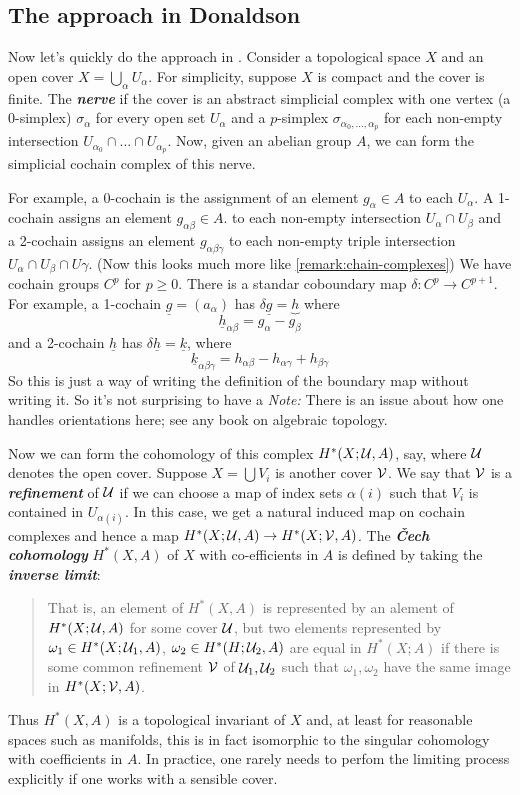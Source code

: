 \subsection{The approach in Donaldson}

Now let's quickly do the approach in \cite{donaldson}.
Consider a topological space $X$ and an open cover $X=\bigcup_\alpha U_\alpha$. For simplicity, suppose $X$ is compact and the cover is finite. The \textbf{\textit{nerve}} if the cover is an abstract simplicial complex with one vertex (a 0-simplex) $\sigma_\alpha$ for every open set $U_\alpha$ and a $p$-simplex $\sigma_{\alpha_0,\ldots,\alpha_p}$ for each non-empty intersection $U_{\alpha_0}\cap\ldots\cap U_{\alpha_p}$. Now, given an abelian group $A$, we can form the simplicial cochain complex of this nerve.

For example, a 0-cochain is the assignment of an element $g_\alpha\in A$ to each $U_\alpha$. A 1-cochain assigns an element $g_{\alpha\beta}\in A$. to each non-empty intersection $U_\alpha\cap U_\beta$ and a 2-cochain assigns an element $g_{\alpha\beta\gamma}$ to each non-empty triple intersection $U_\alpha\cap U_\beta\cap U\gamma$. {\color{cyan}(Now this looks much more like \cref{remark:chain-complexes})} We have cochain groups $C^p$ for $p\geq 0$. There is a standar coboundary map $\delta:C^p\to C^{p+1}$. For example, a 1-cochain $\underline{g}=(a_\alpha)$ has $\delta\underline{g}=\underbrace{h}$ where
\[\underline{h}_{\alpha\beta}=g_\alpha-g_\beta\]
and a 2-cochain $\underline{h}$ has $\delta\underline{h}=\underline{k}$, where
\[\underline{k}_{\alpha\beta\gamma}=h_{\alpha\beta}-h_{\alpha\gamma}+h_{\beta\gamma}\]
{\color{cyan}So this is just a way of writing the definition of the boundary map without writing it. So it's not surprising to have a} \textit{Note:} There is an issue about how one handles orientations here; see any book on algebraic topology.

Now we can form the cohomology of this complex $H^*(X;\mathcal{U},A)$, say, where $\mathcal{U}$ denotes the open cover. Suppose $X=\bigcup V_i$ is another cover $\mathcal{V}$. We say that $\mathcal{V}$ is a \textbf{\textit{refinement}} of $\mathcal{U}$ if we can choose a map of index sets $\alpha(i)$ such that $V_i$ is contained in $U_{\alpha(i)}$. In this case, we get a natural induced map on cochain complexes and hence a map $H^*(X;\mathcal{U},A)\to H^*(X;\mathcal{V},A)$. The \textbf{\textit{\v Cech cohomology}} $H^*(X,A)$ of $X$ with co-efficients in $A$ is defined by taking the \textbf{\textit{inverse limit}}:

\begin{quote}
	That is, an element of $H^*(X,A)$ is represented by an alement of $H^*(X;\mathcal{U},A)$ for some cover $\mathcal{U}$, but two elements represented by $\omega_1\in H^*(X;\mathcal{U}_1,A)$, $\omega_2\in H^*(H;\mathcal{U}_2,A)$ are equal in $H^*(X;A)$ if there is some common refinement $\mathcal{V}$ of $\mathcal{U}_1,\mathcal{U}_2$ such that $\omega_1,\omega_2$ have the same image in $H^*(X;\mathcal{V},A)$.
\end{quote}
Thus $H^*(X,A)$ is a topological invariant of $X$ and, at least for reasonable spaces such as manifolds, this is in fact isomorphic to the singular cohomology with coefficients in $A$. In practice, one rarely needs to perfom the limiting process explicitly if one works with a sensible cover.

